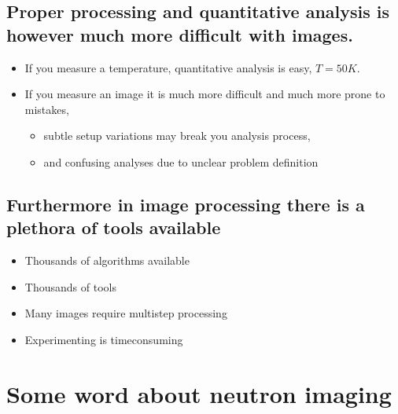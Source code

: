 \documentclass[letterpaper,10pt,english]{sphinxmanual}
\begin{document}
\subsection{Proper processing and quantitative analysis is however much more difficult with images.}
\label{\detokenize{ML4NeutronImageSegmentation:proper-processing-and-quantitative-analysis-is-however-much-more-difficult-with-images}}\begin{itemize}
\item {} 
If you measure a temperature, quantitative analysis is easy, \(T=50K\).

\item {} 
If you measure an image it is much more difficult and much more prone to mistakes,
\begin{itemize}
\item {} 
subtle setup variations may break you analysis process,

\item {} 
and confusing analyses due to unclear problem definition

\end{itemize}

\end{itemize}


\subsection{Furthermore in image processing there is a plethora of tools available}
\label{\detokenize{ML4NeutronImageSegmentation:furthermore-in-image-processing-there-is-a-plethora-of-tools-available}}\begin{itemize}
\item {} 
Thousands of algorithms available

\item {} 
Thousands of tools

\item {} 
Many images require multi\sphinxhyphen{}step processing

\item {} 
Experimenting is time\sphinxhyphen{}consuming

\end{itemize}


\section{Some word about neutron imaging}
\label{\detokenize{ML4NeutronImageSegmentation:some-word-about-neutron-imaging}}
\end{document}
